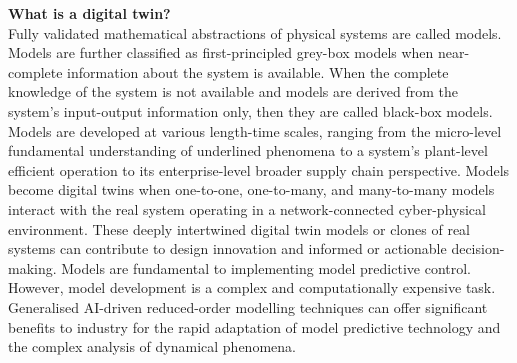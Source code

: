 \documentclass[oneside,11pt,a4paper]{article}
\begin{document}
\textbf{What is a digital twin?}\\[0mm]
Fully validated mathematical abstractions of physical systems are called models. Models are further classified as first-principled grey-box models when near-complete information about the system is available. When the complete knowledge of the system is not available and models are derived from the system's input-output information only, then they are called black-box models.  Models are developed at various length-time scales, ranging from the micro-level fundamental understanding of underlined phenomena to a system's plant-level efficient operation to its enterprise-level broader supply chain perspective. Models become digital twins when one-to-one, one-to-many, and many-to-many models interact with the real system operating in a network-connected cyber-physical environment. These deeply intertwined digital twin models or clones of real systems can contribute to design innovation and informed or actionable decision-making. Models are fundamental to implementing model predictive control. However, model development is a complex and computationally expensive task. Generalised AI-driven reduced-order modelling techniques can offer significant benefits to industry for the rapid adaptation of model predictive technology and the complex analysis of dynamical phenomena.
\end{document}
